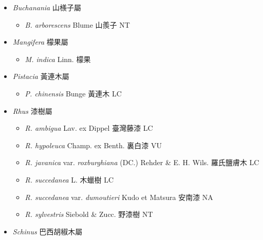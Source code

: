 
  \begin{itemize}
 \item[] \textit{Buchanania} 山檨子屬
                                
  \begin{itemize}
        \item[] \textit{B. arborescens} Blume  山羨子   NT
  \end{itemize}
 \item[] \textit{Mangifera} 檬果屬
                                
  \begin{itemize}
        \item[] \textit{M. indica} Linn.  檬果   
  \end{itemize}
 \item[] \textit{Pistacia} 黃連木屬
                                
  \begin{itemize}
        \item[] \textit{P. chinensis} Bunge  黃連木   LC
  \end{itemize}
 \item[] \textit{Rhus} 漆樹屬
                                
  \begin{itemize}
        \item[] \textit{R. ambigua} Lav. ex Dippel  臺灣藤漆   LC
        \item[] \textit{R. hypoleuca} Champ. ex Benth.  裏白漆   VU
        \item[] \textit{R. javanica} var. \textit{roxburghiana} (DC.) Rehder \& E. H. Wils.  羅氏鹽膚木   LC
        \item[] \textit{R. succedanea} L.  木蠟樹   LC
        \item[] \textit{R. succedanea} var. \textit{dumoutieri} Kudo et Matsura  安南漆   NA
        \item[] \textit{R. sylvestris} Siebold \& Zucc.  野漆樹   NT
  \end{itemize}
 \item[] \textit{Schinus} 巴西胡椒木屬
                                

\end{itemize}
